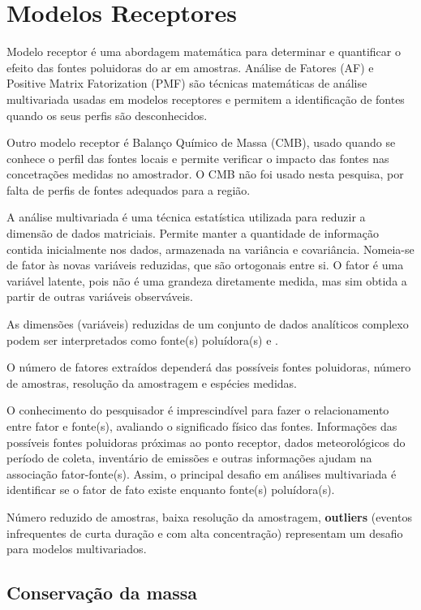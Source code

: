 \section{Modelos Receptores}

Modelo receptor é uma abordagem matemática para determinar e 
quantificar o efeito das fontes poluidoras do ar em amostras.
Análise de Fatores (AF) e Positive Matrix Fatorization (PMF) são técnicas 
matemáticas de análise multivariada usadas em modelos receptores e 
permitem a identificação de fontes quando os seus perfis são desconhecidos.

Outro modelo receptor é Balanço Químico de Massa (CMB), usado quando se conhece 
o perfil das fontes locais e permite verificar o impacto das fontes 
nas concetrações medidas no amostrador. O CMB não foi usado nesta pesquisa, 
por falta de perfis de fontes adequados para a região.

A análise multivariada é uma técnica estatística utilizada para 
reduzir a dimensão de dados matriciais. 
Permite manter a quantidade de informação contida inicialmente nos dados, 
armazenada na variância e covariância. 
Nomeia-se de fator às novas variáveis reduzidas, que são
ortogonais entre si. 
O fator é uma variável latente, pois não é uma grandeza diretamente
medida, mas sim obtida a partir de outras variáveis observáveis. 

As dimensões (variáveis) reduzidas de um conjunto de dados analíticos 
complexo podem ser interpretados como fonte(s) poluídora(s) 
\citep{wang2012} e \citep{mansha2012}.

O número de fatores extraídos dependerá das possíveis 
fontes poluidoras, número de amostras, resolução da amostragem 
e espécies medidas.

O conhecimento do pesquisador é imprescindível para fazer o relacionamento 
entre fator e fonte(s), avaliando o significado físico das fontes. 
Informações das possíveis fontes poluidoras próximas ao ponto 
receptor, dados meteorológicos do período de coleta, inventário de emissões 
e outras informações ajudam na associação fator-fonte(s).
Assim, o principal desafio em análises multivariada é identificar 
se o fator de fato existe enquanto fonte(s) poluídora(s). 

Número reduzido de amostras, baixa resolução da amostragem, \textbf{outliers} 
(eventos infrequentes de curta duração e com alta concentração) representam 
um desafio para modelos multivariados.

\subsection{Conservação da massa}

